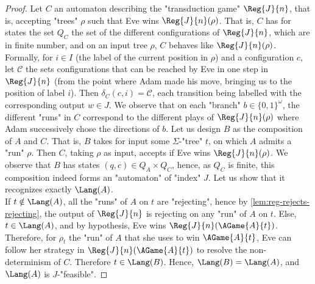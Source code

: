 \documentclass[a4paper,UKenglish,cleveref, autoref, thm-restate]{lipics-v2021}
\newcommand{\C}{\mathcal{C}}
\begin{document}
\automataComposition*
\begin{proof}
	Let $C$ an automaton describing the "transduction game" $\Reg{J}{n}$, that is, accepting "trees" $\rho$ such that Eve wins $\Reg{J}{n}(\rho)$. 
	That is, $C$ has for states the set $Q_C$ the set of the different configurations of $\Reg{J}{n}$, which are in finite number, and on an input tree $\rho$, $C$ behaves like $\Reg{J}{n}(\rho)$. Formally, for $i\in I$ (the label of the current position in $\rho$) and a configuration $c$, let $\C$ the sets configurations that can be reached by Eve in one step in $\Reg{J}{n}$ (from the point where Adam made his move, bringing us to the position of label $i$). Then $\delta_C(c,i) = \C$, each transition being labelled with the corresponding output $w \in J$. We observe that on each "branch" $b \in \{0,1\}^\omega$, the different "runs" in $C$ correspond to the different plays of $\Reg{J}{n}(\rho)$ where Adam successively chose the directions of $b$.
	Let us design $B$ as the composition of $A$ and $C$. That is, $B$ takes for input some $\Sigma$-"tree" $t$, on which $A$ admits a "run" $\rho$. Then $C$, taking $\rho$ as input, accepts if Eve wins $\Reg{J}{n}(\rho)$. We observe that $B$ has states $(q,c) \in Q_A \times Q_C$, hence, as $Q_C$ is finite, this composition indeed forms an "automaton" of "index" $J$. Let us show that it recognizes exactly $\Lang(A)$.\\
	If $t\notin \Lang(A)$, all the "runs" of $A$ on $t$ are "rejecting", hence by \cref{lem:reg-rejects-rejecting}, the output of $\Reg{J}{n}$ is rejecting on any "run" of $A$ on $t$. Else, $t\in \Lang(A)$, and by hypothesis, Eve wins $\Reg{J}{n}(\AGame{A}{t})$. Therefore, for $\rho_t$ the "run" of $A$ that she uses to win $\AGame{A}{t}$, Eve can follow her strategy in $\Reg{J}{n}(\AGame{A}{t})$ to resolve the non-determinism of $C$. Therefore $t \in \Lang(B)$. Hence, $\Lang(B) = \Lang(A)$, and $\Lang(A)$ is $J$-"feasible".
\end{proof}

\regRejectsRejecting*
\end{document}
